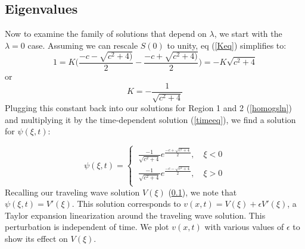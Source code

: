 \documentclass[12pt]{article}
\begin{document}
\subsection{Eigenvalues}
Now to examine the family of solutions that depend on $\lambda$, we start with the $\lambda = 0$ case. Assuming we can rescale $S(0)$ to unity, eq (\ref{Keq}) simplifies to:
$$1 = K\Bigg(\frac{-c-\sqrt{c^2+4)}}{2} - \frac{-c+\sqrt{c^2+4)}}{2}\Bigg) = -K\sqrt{c^2+4} $$
or
$$K = -\frac{1}{\sqrt{c^2+4}}$$
Plugging this constant back into our solutions for Region 1 and 2 (\ref{homogsln}) and multiplying it by the time-dependent solution (\ref{timeeq}), we find a solution for $\psi(\xi,t)$:

\begin{equation}\label{solnlambda0}
\psi(\xi,t)=
\begin{cases}
\ \frac{-1}{\sqrt{c^2+4}}e^{\frac{-c+\sqrt{c^2+4}}{2}},\quad \xi < 0 \\
\ \frac{-1}{\sqrt{c^2+4}}e^{\frac{-c-\sqrt{c^2+4}}{2}},\quad \xi > 0\\
\end{cases}
\end{equation}
Recalling our traveling wave solution $V(\xi)$ (\ref{}), we note that $\psi(\xi,t) = V'(\xi)$. This solution corresponds to $v(x,t) = V(\xi) + \epsilon V'(\xi)$, a Taylor expansion linearization around the traveling wave solution. This perturbation is independent of time. We plot $v(x,t)$ with various values of $\epsilon$ to show its effect on $V(\xi)$.
\end{document}
